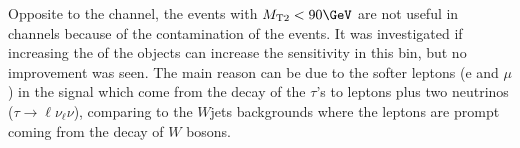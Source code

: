 Opposite to the \tauTau channel, the events with $\mttwo<90 \GeV$ are not useful in \leptonTau channels because of the contamination of 
the \wjets events. It was investigated if increasing the \pt of the objects can increase the sensitivity in this bin, but no improvement was seen.
The main reason can be due to the softer leptons (e and $\mu$) in the signal which come from the decay of the $\tau$'s 
to leptons plus two neutrinos ($\tau\rightarrow\ell\nu_{\ell}\nu$), 
comparing to the $W$jets backgrounds where the leptons are prompt coming from the decay of $W$ bosons.
